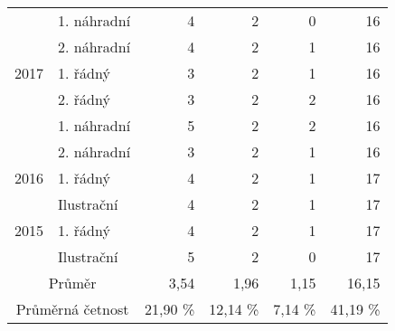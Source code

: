 \begin{table}[p]
\begin{center}
\begin{tabular}{|l|l|r|r|r|r|}
			\multicolumn{ 1}{|l|}{} & 1. náhradní  & 4 & 2 & 0 & 16 \\ \cline{ 2- 6}
			\multicolumn{ 1}{|l|}{} & 2. náhradní  & 4 & 2 & 1 & 16 \\ \hline
			\multicolumn{ 1}{|c|}{2017} & 1. řádný  & 3 & 2 & 1 & 16 \\ \cline{ 2- 6}
			\multicolumn{ 1}{|l|}{} & 2. řádný  & 3 & 2 & 2 & 16 \\ \cline{ 2- 6}
			\multicolumn{ 1}{|l|}{} & 1. náhradní  & 5 & 2 & 2 & 16 \\ \cline{ 2- 6}
			\multicolumn{ 1}{|l|}{} & 2. náhradní  & 3 & 2 & 1 & 16 \\ \hline
			\multicolumn{ 1}{|c|}{2016} & 1. řádný  & 4 & 2 & 1 & 17 \\ \cline{ 2- 6}
			\multicolumn{ 1}{|l|}{} & Ilustrační & 4 & 2 & 1 & 17 \\ \hline
			\multicolumn{ 1}{|c|}{2015} & 1. řádný  & 4 & 2 & 1 & 17 \\ \cline{ 2- 6}
			\multicolumn{ 1}{|l|}{} & Ilustrační & 5 & 2 & 0 & 17 \\ \hline
			\multicolumn{ 2}{|c|}{Průměr} & 3,54 & 1,96 & 1,15 & 16,15 \\ \hline
			\multicolumn{ 2}{|c|}{Průměrná četnost} & 21,90 \% & 12,14 \% & 7,14 \% & 41,19 \% \\ \hline
		\end{tabular}
	\end{center}
	\label{tab:4ulo}
\end{table}

